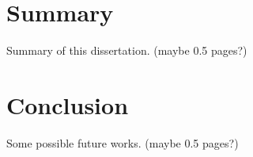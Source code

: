 \section{Summary}
Summary of this dissertation. (maybe 0.5 pages?)

\section{Conclusion}
Some possible future works. (maybe 0.5 pages?)
